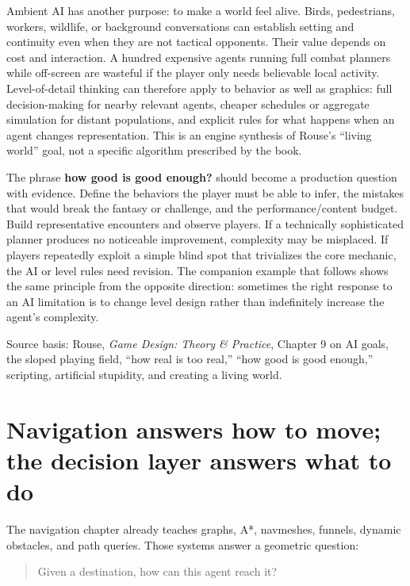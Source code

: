 Ambient AI has another purpose: to make a world feel alive. Birds, pedestrians, workers, wildlife, or background conversations can establish setting and continuity even when they are not tactical opponents. Their value depends on cost and interaction. A hundred expensive agents running full combat planners while off-screen are wasteful if the player only needs believable local activity. Level-of-detail thinking can therefore apply to behavior as well as graphics: full decision-making for nearby relevant agents, cheaper schedules or aggregate simulation for distant populations, and explicit rules for what happens when an agent changes representation. This is an engine synthesis of Rouse's ``living world'' goal, not a specific algorithm prescribed by the book.

The phrase \textbf{how good is good enough?} should become a production question with evidence. Define the behaviors the player must be able to infer, the mistakes that would break the fantasy or challenge, and the performance/content budget. Build representative encounters and observe players. If a technically sophisticated planner produces no noticeable improvement, complexity may be misplaced. If players repeatedly exploit a simple blind spot that trivializes the core mechanic, the AI or level rules need revision. The companion example that follows shows the same principle from the opposite direction: sometimes the right response to an AI limitation is to change level design rather than indefinitely increase the agent's complexity.

Source basis: Rouse, \emph{Game Design: Theory \& Practice}, Chapter 9 on AI goals, the sloped playing field, ``how real is too real,'' ``how good is good enough,'' scripting, artificial stupidity, and creating a living world.

\section{Navigation answers how to move; the decision layer answers what to do}\label{06-engine-ii-ch047-navigation-answers-how-to-move-the-decision-layer-answers-what-to-do}

The navigation chapter already teaches graphs, A*, navmeshes, funnels, dynamic obstacles, and path queries. Those systems answer a geometric question:

\begin{quote}
Given a destination, how can this agent reach it?
\end{quote}

